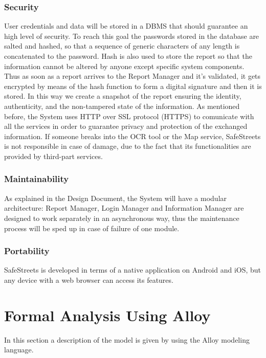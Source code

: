 \documentclass{report}
\begin{document}
\subsection{Security} \label{sec:security}
User credentials and data will be stored in a DBMS that should guarantee an high level of security. To reach this goal the passwords stored in the database are salted and hashed, so that a sequence of generic characters of any length is concatenated to the password.
Hash is also used to store the report so that the information cannot be altered by anyone except specific system components. Thus as soon as a report arrives to the Report Manager and it's validated, it gets encrypted by means of the hash function to form a digital signature and then it is stored. In this way we create a snapshot of the report ensuring the identity, authenticity, and the non-tampered state of the information.
As mentioned before, the System uses HTTP over SSL protocol (HTTPS) to comunicate with all the services in order to guarantee privacy and protection of the exchanged information.
\newline
If someone breaks into the OCR tool or the Map service, SafeStreets is not responsible in case of damage, due to the fact that its functionalities are provided by third-part services.  
\subsection{Maintainability}
As explained in the Design Document, the System will have a modular architecture: Report Manager, Login Manager and Information Manager are designed to work separately in an asynchronous way, thus the maintenance process will be sped up in case of failure of one module.
\subsection{Portability}
SafeStreets is developed in terms of a native application on Android and iOS, but any device with a web browser can access its features.

\chapter{Formal Analysis Using Alloy}
In this section a description of the model is given by using the Alloy modeling language.
\end{document}
